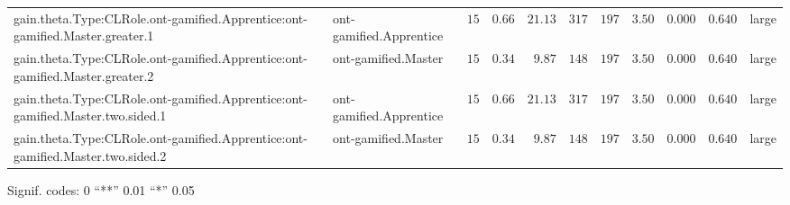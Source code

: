 \documentclass[6pt]{article}
\begin{document}
\begin{landscape}
{\begin{longtable}{llrrrrrrrrl}
gain.theta.Type:CLRole.ont-gamified.Apprentice:ont-gamified.Master.greater.1&ont-gamified.Apprentice&$15$&$0.66$&$21.13$&$317$&$197$&$ 3.50$&$0.000$&$0.640$&large\tabularnewline
gain.theta.Type:CLRole.ont-gamified.Apprentice:ont-gamified.Master.greater.2&ont-gamified.Master&$15$&$0.34$&$ 9.87$&$148$&$197$&$ 3.50$&$0.000$&$0.640$&large\tabularnewline
gain.theta.Type:CLRole.ont-gamified.Apprentice:ont-gamified.Master.two.sided.1&ont-gamified.Apprentice&$15$&$0.66$&$21.13$&$317$&$197$&$ 3.50$&$0.000$&$0.640$&large\tabularnewline
gain.theta.Type:CLRole.ont-gamified.Apprentice:ont-gamified.Master.two.sided.2&ont-gamified.Master&$15$&$0.34$&$ 9.87$&$148$&$197$&$ 3.50$&$0.000$&$0.640$&large\tabularnewline
\hline
\end{longtable}}\end{landscape}
\begin{flushright}{ \tiny{ Signif. codes:  0 ``**'' 0.01 ``*'' 0.05 }}\end{flushright} 
\end{document}
